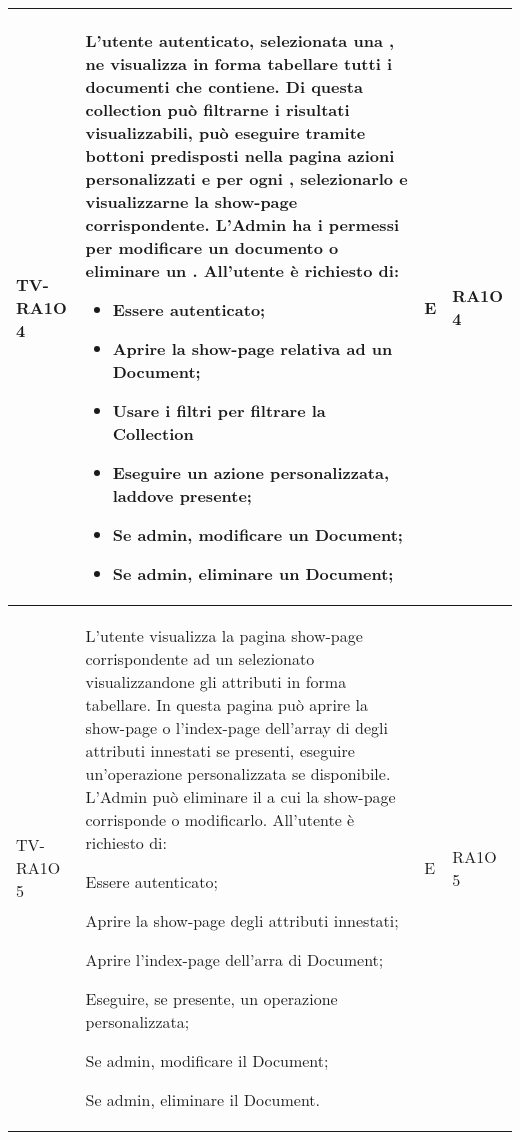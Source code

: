 \begin{center}
\begin{longtable}{| p{3cm} | p{6cm} | p{1.5cm} | p{2cm} | }
				TV-RA1O 4 & 
				L'utente autenticato, selezionata una \glossario{Collection}, ne visualizza in forma tabellare tutti i documenti che contiene. \newline Di questa collection può filtrarne i risultati visualizzabili, può eseguire tramite bottoni predisposti nella pagina azioni personalizzati e per ogni \glossario{Document}, selezionarlo e visualizzarne la show-page corrispondente. \newline L'Admin ha i permessi per modificare un documento o eliminare un \glossario{Document}. \newline
All'utente è richiesto di:
\begin{itemize}
\item Essere autenticato;
\item Aprire la show-page relativa ad un Document;
\item Usare i filtri per filtrare la Collection
\item Eseguire un azione personalizzata, laddove presente;
\item Se admin, modificare un Document;
\item Se admin, eliminare un Document;
\end{itemize} & E & RA1O 4\newline  \\ \hline 
				TV-RA1O 5 & 
				L'utente visualizza la pagina show-page corrispondente ad un \glossario{Document} selezionato visualizzandone gli attributi in forma tabellare. \newline In questa pagina può aprire la show-page o l'index-page dell'array di \glossario{Document} degli attributi innestati se presenti, eseguire un'operazione personalizzata se disponibile. \newline L'Admin può eliminare il \glossario{Document} a cui la show-page corrisponde o modificarlo. 
All'utente è richiesto di:
\begin{item}
\item Essere autenticato;
\item Aprire la show-page degli attributi innestati;
\item Aprire l'index-page dell'arra di Document;
\item Eseguire, se presente, un operazione personalizzata;
\item Se admin, modificare il Document;
\item Se admin, eliminare il Document.
\end{item} & E & RA1O 5\newline  \\ \hline 

\end{longtable}
\end{center}
